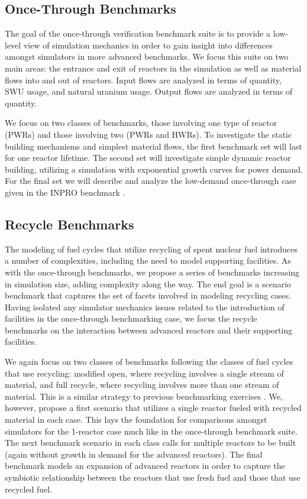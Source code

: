 \documentclass{anstrans}
\begin{document}
\subsection{Once-Through Benchmarks}
The goal of the once-through verification benchmark suite is to provide a
low-level view of simulation mechanics in order to gain insight into differences
amongst simulators in more advanced benchmarks. We focus this suite on two main
areas: the entrance and exit of reactors in the simulation as well as material
flows into and out of reactors. Input flows are analyzed in terms of quantity,
SWU usage, and natural uranium usage. Output flows are analyzed in terms of
quantity.

We focus on two classes of benchmarks, those involving one type of reactor
(PWRs) and those involving two (PWRs and HWRs). To investigate the static
building mechanisms and simplest material flows, the first benchmark set will
last for one reactor lifetime. The second set will investigate simple dynamic
reactor building, utilizing a simulation with exponential growth curves for
power demand. For the final set we will describe and analyze the low-demand
once-through case given in the INPRO benchmark \cite{_international_2011}.

\subsection{Recycle Benchmarks}
The modeling of fuel cycles that utilize recycling of spent nuclear fuel
introduces a number of complexities, including the need to model supporting
facilities. As with the once-through benchmarks, we propose a series of
benchmarks increasing in simulation size, adding complexity along the way. The
end goal is a scenario benchmark that captures the set of facets involved in
modeling recycling cases. Having isolated any simulator mechanics issues related
to the introduction of facilities in the once-through benchmarking case, we
focus the recycle benchmarks on the interaction between advanced reactors and
their supporting facilities.

We again focus on two classes of benchmarks following the classes of fuel cycles
that use recycling: modified open, where recycling involves a single stream of
material, and full recycle, where recycling involves more than one stream of
material. This is a similar strategy to previous benchmarking exercises
\cite{boucher_specification_2008}. We, however, propose a first scenario that
utilizes a single reactor fueled with recycled material in each case. This lays
the foundation for comparisons amongst simulators for the 1-reactor case much
like in the once-through benchmark suite. The next benchmark scenario in each
class calls for multiple reactors to be built (again without growth in demand
for the advanced reactors). The final benchmark models an expansion of advanced
reactors in order to capture the symbiotic relationship between the reactors
that use fresh fuel and those that use recycled fuel. 
\end{document}
